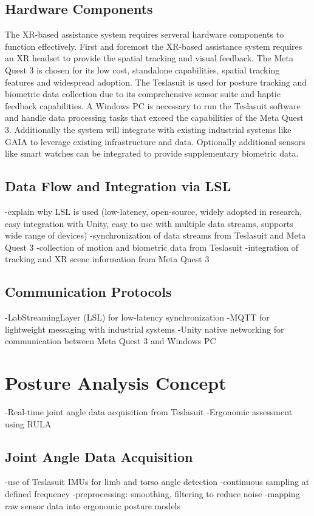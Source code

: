 \subsection{Hardware Components}
The XR-based assistance system requires serveral hardware components to function effectively. First and foremost the XR-based assistance system requires an XR headset to provide the spatial tracking and visual feedback. The Meta Quest 3 is chosen for its low cost, standalone capabilities, spatial tracking features and widespread adoption. The Teslasuit is used for posture tracking and biometric data collection due to its comprehensive sensor suite and haptic feedback capabilities. A Windows PC is necessary to run the Teslasuit software and handle data processing tasks that exceed the capabilities of the Meta Quest 3. Additionally the system will integrate with existing industrial systems like GAIA to leverage existing infrastructure and data. Optionally additional sensors like smart watches can be integrated to provide supplementary biometric data.

\subsection{Data Flow and Integration via LSL}
-explain why LSL is used (low-latency, open-source, widely adopted in research, easy integration with Unity, easy to use with multiple data streams, supports wide range of devices)
-synchronization of data streams from Teslasuit and Meta Quest 3 
-collection of motion and biometric data from Teslasuit
-integration of tracking and XR scene information from Meta Quest 3
\subsection{Communication Protocols}
-LabStreamingLayer (LSL) for low-latency synchronization
-MQTT for lightweight messaging with industrial systems
-Unity native networking for communication between Meta Quest 3 and Windows PC

\section{Posture Analysis Concept}
-Real-time joint angle data acquisition from Teslasuit
-Ergonomic assessment using RULA
\subsection{Joint Angle Data Acquisition}
-use of Teslasuit IMUs for limb and torso angle detection
-continuous sampling at defined frequency
-preprocessing: smoothing, filtering to reduce noise
-mapping raw sensor data into ergonomic posture models
